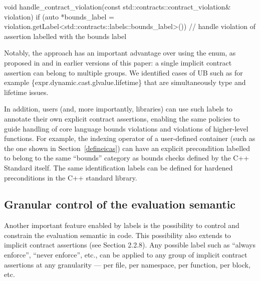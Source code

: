 \begin{codeblock}
void handle_contract_violation(const std::contracts::contract_violation& violation)
{
  if (auto *bounds_label =
      violation.getLabel<std::contracts::labels::bounds_label>()) {
      // handle violation of assertion labelled with the bounds label
  }
}
\end{codeblock} 

%
%

Notably, the \cite{P3400R1} approach has an important advantage over using the  enum, as proposed in \cite{P3081R1} and in earlier versions of this paper: a single implicit contract assertion can belong to multiple groups. We identified cases of UB such as for example \{expr.dynamic.cast.glvalue.lifetime\} that are simultaneously type and lifetime issues.

In addition, users (and, more importantly, libraries) can use such labels to annotate their own explicit contract assertions, enabling the same policies to guide handling of core language bounds violations and violations of higher-level functions. For example, the indexing operator of a user-defined container (such as the one shown in Section~\ref{defineicas}) can have an explicit precondition labelled to belong to the same ``bounds'' category as bounds checks defined by the C++ Standard itself. The same identification labels can be defined for hardened preconditions in the C++ standard library.

\subsection{Granular control of the evaluation semantic}
\label{semantic}

Another important feature enabled by labels is the possibility to control and constrain the evaluation semantic in code. This possibility also extends to implicit contract assertions (see \cite{P3400R1} Section 2.2.8). Any possible label such as ``always enforce'', ``never enforce'', etc., can be applied to any group of implicit contract assertions at any granularity --- per file, per namespace, per function, per block, etc.  

